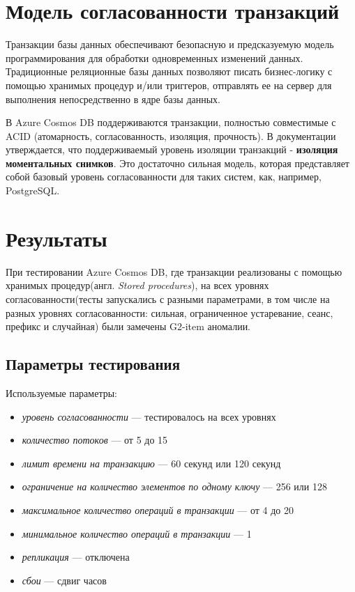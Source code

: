 \documentclass[14pt,  openany]{book}
\begin{document}
\section{Модель согласованности транзакций}
Транзакции базы данных обеспечивают безопасную и предсказуемую модель программирования для обработки одновременных изменений данных. Традиционные реляционные базы данных позволяют писать бизнес-логику с помощью хранимых процедур и/или триггеров, отправлять ее на сервер для выполнения непосредственно в ядре базы данных. 
\par В Azure Cosmos DB поддерживаются транзакции, полностью совместимые с ACID (атомарность, согласованность, изоляция, прочность). В документации утверждается, что поддерживаемый уровень изоляции транзакций - \textbf{изоляция моментальных снимков}.  Это достаточно сильная модель, которая представляет собой базовый уровень согласованности для таких систем, как, например, PostgreSQL. 

\section{Результаты}
При тестировании Azure Cosmos DB, где транзакции реализованы с помощью хранимых процедур(англ. \textit{Stored procedures}), на всех уровнях согласованности(тесты запускались с разными параметрами, в том числе на разных уровнях согласованности: сильная, ограниченное устаревание, сеанс, префикс и случайная) были замечены G2-item  аномалии. 
\subsection{Параметры тестирования}
Используемые параметры:
\begin{itemize}
\item[] \textit{уровень согласованности} --- тестировалось на всех уровнях
\item[] \textit{количество потоков} --- от 5 до 15
\item[] \textit{лимит времени на транзакцию} --- 60 секунд или 120 секунд
\item[] \textit{ограничение на количество элементов по одному ключу} --- 256 или 128
\item[] \textit{максимальное количество операций в транзакции} --- от 4 до 20
\item[] \textit{минимальное количество операций в транзакции} --- 1
\item[] \textit{репликация} --- отключена
\item[] \textit{сбои} --- сдвиг часов
\end{itemize}
\end{document}
